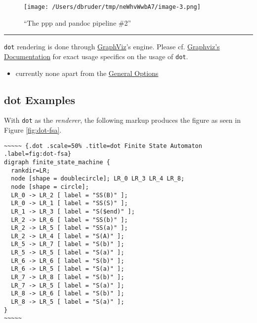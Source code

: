 \documentclass[]{article}
\begin{document}
\normalsize

\begin{figure}[htbp]
\centering
\texttt{[image: /Users/dbruder/tmp/neWhvWwbA7/image-3.png]}
\caption{``The ppp and pandoc pipeline
\#2''\label{fig:pipeline-overview-2}}
\end{figure}

\begin{center}\rule{3in}{0.4pt}\end{center}

\newpage


\texttt{dot} rendering is done through
\href{http://www.graphviz.org/}{GraphViz}'s engine. Please cf.
\href{http://www.graphviz.org/Documentation.php}{Graphviz's
Documentation} for exact usage specifics on the usage of \texttt{dot}.


\begin{itemize}
\itemsep1pt\parskip0pt
\item
  currently none apart from the \hyperref[general-options]{General
  Options}
\end{itemize}

\subsection{dot Examples}\label{dot-examples}

With \texttt{dot} as the \emph{renderer}, the following markup produces
the figure as seen in Figure \ref{fig:dot-fsa}.

\scriptsize

\begin{verbatim}
~~~~~ {.dot .scale=50% .title=dot Finite State Automaton .label=fig:dot-fsa}
digraph finite_state_machine {
  rankdir=LR;
  node [shape = doublecircle]; LR_0 LR_3 LR_4 LR_8;
  node [shape = circle];
  LR_0 -> LR_2 [ label = "SS(B)" ];
  LR_0 -> LR_1 [ label = "SS(S)" ];
  LR_1 -> LR_3 [ label = "S($end)" ];
  LR_2 -> LR_6 [ label = "SS(b)" ];
  LR_2 -> LR_5 [ label = "SS(a)" ];
  LR_2 -> LR_4 [ label = "S(A)" ];
  LR_5 -> LR_7 [ label = "S(b)" ];
  LR_5 -> LR_5 [ label = "S(a)" ];
  LR_6 -> LR_6 [ label = "S(b)" ];
  LR_6 -> LR_5 [ label = "S(a)" ];
  LR_7 -> LR_8 [ label = "S(b)" ];
  LR_7 -> LR_5 [ label = "S(a)" ];
  LR_8 -> LR_6 [ label = "S(b)" ];
  LR_8 -> LR_5 [ label = "S(a)" ];
}
~~~~~
\end{verbatim}
\end{document}
